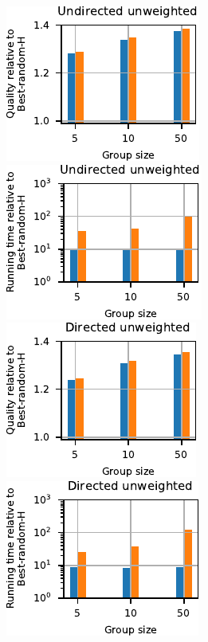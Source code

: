 \begin{figure}[tb]
\begin{subfigure}[t]{\textwidth}
\centering
\includegraphics[width=.24\textwidth]{./sources/plots/gh-gc-apx/quality-harmonic-high-diameter-undirected-unweighted.pdf}
\includegraphics[width=.24\textwidth]{./sources/plots/gh-gc-apx/time-harmonic-high-diameter-undirected-unweighted.pdf}
\includegraphics[width=.24\textwidth]{./sources/plots/gh-gc-apx/quality-harmonic-high-diameter-directed-unweighted.pdf}
\includegraphics[width=.24\textwidth]{./sources/plots/gh-gc-apx/time-harmonic-high-diameter-directed-unweighted.pdf}
\medskip


\end{subfigure}
\end{figure}
